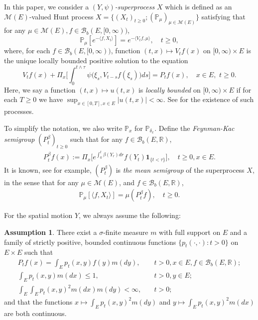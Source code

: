 \documentclass[12pt,a4paper]{amsart}
\numberwithin{equation}{section}
\theoremstyle{plain}
\theoremstyle{definition}
\newtheorem{asp}{Assumption}
\begin{document}
\par
In this paper, we consider a \emph{$(Y,\psi)$-superprocess} $X$ which is defined as an $\mathcal M(E)$-valued Hunt process $X=\{(X_t)_{t\geq 0}; (\mathbb
P_\mu)_{\mu \in \mathcal M(E)}\}$ satisfying that for any $\mu \in \mathcal M(E), f\in \mathcal B_b(E, [0,\infty))$,
\begin{equation}
  \label{eq:_def_of_vtf}
  \mathbb P_\mu [e^{-\langle f,X_t\rangle}] = e^{-\langle V_tf, \mu\rangle},
  \quad t\geq 0,
\end{equation}
where, for each $f\in\mathcal B_b(E, [0,\infty))$, function $(t,x) \mapsto V_tf(x)$ on $[0,\infty) \times E$ is the unique locally bounded positive solution to the
equation
\begin{equation}\label{eq:FKPP_in_definition}
  V_t f(x) +   \Pi_x\Big[\int_0^{t\wedge \tau} \psi \big(\xi_s,V_{t-s} f(\xi_s)\big) ds\Big]
	= P_t f(x),
	\quad x \in E,\,\, t \geq 0.
\end{equation}
Here, we say a function $(t,x)\mapsto u(t,x)$ is \emph{locally bounded} on $[0,\infty) \times E$ if for each $T\geq 0$ we have $\sup_{x\in [0,T],x\in E} |u(t,x)| < \infty$. 
See \cite[Theorem 5.11]{Li2011Measurevalued} for the existence of such processes.
\par
To simplify the notation, we also write $\mathbb P_x$ for $\mathbb P_{\delta_x}$.
Define the \emph{Feynman-Kac semigroup} $(P^\beta_t)_{t\geq 0}$ such that for any $ f\in \mathcal B_b(E,\mathbb R)$,
\begin{align}
	P^\beta_tf(x)
	:= \Pi_x \big[e^{\int_0^{t} \beta(Y_r)dr} f(Y_t)\mathbf 1_{\{t<\tau\}}\big],
	\quad t\geq 0, x\in E.
\end{align}
It is known, see \cite[Proposition 2.27]{Li2011Measurevalued} for example, $(P^\beta_t)$ is \emph{the mean semigroup} of the superprocess $X$, in the sense that for any $\mu \in \mathcal M(E)$, and $f \in \mathcal B_b(E,\mathbb R)$,
\begin{align} \label{eq:Yaglom_type_result_without_2rd} 
\mathbb P_\mu [\langle f,X_t\rangle] = \mu(P^\beta_t f), \quad t \geq 0.
\end{align}
\par
For the spatial motion $Y$, we always assume the following:
\begin{asp}\label{asp:1}
  There exist a $\sigma$-finite measure $m$ with full support on $E$ and a family
  of strictly positive, bounded continuous functions $\{ p_t(\cdot,\cdot): t > 0
  \}$ on $E \times E$ such that
  \begin{align}
  	P_tf(x)
  	= \int_E p_t(x,y) f(y) m(dy),
  	&\quad t>0, x \in E,f \in \mathcal B_b(E,\mathbb R);
  	\\ \int_E p_t(x,y)m(dx)\leq 1, &\quad t>0,y\in E;
  	\\ \int_E \int_E p_t(x,y)^2 m(dx) m(dy)
  	<\infty,
  	&\quad t> 0;
  \end{align}
  and that the functions $x \mapsto \int_E p_t(x,y)^2 m(dy)$ and $y \mapsto \int_E
  p_t(x,y)^2 m(dx)$ are both continuous.
\end{asp}
\end{document}
